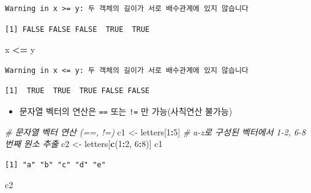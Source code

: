 \documentclass[
  11pt,
]{krantz}
\newenvironment{Shaded}{\begin{snugshade}}{\end{snugshade}}
\newcommand{\CommentTok}[1]{\textcolor[rgb]{0.37,0.37,0.37}{\textit{#1}}}
\newcommand{\DecValTok}[1]{\textcolor[rgb]{0.06,0.06,0.06}{#1}}
\newcommand{\KeywordTok}[1]{\textcolor[rgb]{0.27,0.27,0.27}{\textbf{#1}}}
\newcommand{\NormalTok}[1]{#1}
\newcommand{\OperatorTok}[1]{\textcolor[rgb]{0.43,0.43,0.43}{\textbf{#1}}}
\newcommand{\StringTok}[1]{\textcolor[rgb]{0.5,0.5,0.5}{#1}}
\providecommand{\tightlist}{%
  \setlength{\itemsep}{0pt}\setlength{\parskip}{0pt}}
\begin{document}
\begin{verbatim}
Warning in x >= y: 두 객체의 길이가 서로 배수관계에 있지 않습니다
\end{verbatim}

\begin{verbatim}
[1] FALSE FALSE FALSE  TRUE  TRUE
\end{verbatim}

\begin{Shaded}
\begin{Highlighting}[]
\NormalTok{x }\OperatorTok{<=}\StringTok{ }\NormalTok{y}
\end{Highlighting}
\end{Shaded}

\begin{verbatim}
Warning in x <= y: 두 객체의 길이가 서로 배수관계에 있지 않습니다
\end{verbatim}

\begin{verbatim}
[1]  TRUE  TRUE  TRUE FALSE FALSE
\end{verbatim}

\normalsize

\begin{itemize}
\tightlist
\item
  문자열 벡터의 연산은 \texttt{==} 또는 \texttt{!=} 만 가능(사칙연산 불가능)
\end{itemize}

\footnotesize

\begin{Shaded}
\begin{Highlighting}[]
\CommentTok{# 문자열 벡터 연산 (==, !=)}
\NormalTok{c1 <-}\StringTok{ }\NormalTok{letters[}\DecValTok{1}\OperatorTok{:}\DecValTok{5}\NormalTok{]}
\CommentTok{# a-z로 구성된 벡터에서 1-2, 6-8 번째 원소 추출}
\NormalTok{c2 <-}\StringTok{ }\NormalTok{letters[}\KeywordTok{c}\NormalTok{(}\DecValTok{1}\OperatorTok{:}\DecValTok{2}\NormalTok{, }\DecValTok{6}\OperatorTok{:}\DecValTok{8}\NormalTok{)] }
\NormalTok{c1}
\end{Highlighting}
\end{Shaded}

\begin{verbatim}
[1] "a" "b" "c" "d" "e"
\end{verbatim}

\begin{Shaded}
\begin{Highlighting}[]
\NormalTok{c2}
\end{Highlighting}
\end{Shaded}
\end{document}
